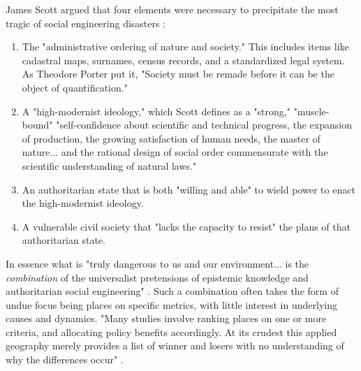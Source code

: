 James Scott argued that four elements were necessary to precipitate the most tragic of social engineering disasters \cite{scottSeeingStateHow2020}:

\begin{enumerate} \setlength{\itemsep}{0pt} \setlength{\parskip}{0pt} 
	\item{The "administrative ordering of nature and society." This includes items like cadastral maps, surnames, census records, and a standardized legal system. As Theodore Porter put it, "Society must be remade before it can be the object of quantification." \cite{porter1992objectivity}}
	\item{A "high-modernist ideology," which Scott defines as a "strong," "muscle-bound" "self-confidence about scientific and technical progress, the expansion of production, the growing satisfaction of human needs, the master of nature... and the rational design of social order commensurate with the scientific understanding of natural laws."}
	\item{An authoritarian state that is both "willing and able" to wield power to enact the high-modernist ideology.}
	\item{A vulnerable civil society that "lacks the capacity to resist" the plans of that authoritarian state.}
\end{enumerate}

In essence what is "truly dangerous to us and our environment... is the \textit{combination} of the universalist pretensions of epistemic knowledge and authoritarian social engineering" \cite{scottSeeingStateHow2020}. Such a combination often takes the form of undue focus being places on specific metrics, with little interest in underlying causes and dynamics. "Many studies involve ranking places on one or more criteria, and allocating policy benefits accordingly. At its crudest this applied geography merely provides a list of winner and losers with no understanding of why the differences occur" \cite{taylorGeographicInformationSystems1994}.

